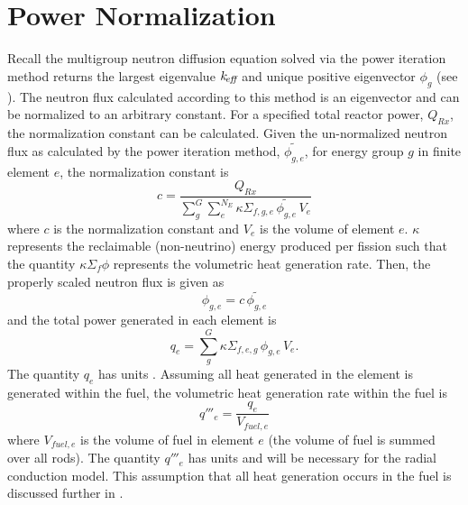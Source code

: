 \section{Power Normalization}
  Recall the multigroup neutron diffusion equation solved via the power
  iteration method returns the largest eigenvalue $k_{\!\mbox{\scriptsize \em eff}}$ and unique positive
  eigenvector $\phi_g$ (see ). The neutron flux
  calculated according to this method is an eigenvector and can be normalized
  to an arbitrary constant. For a specified total reactor power, $Q_{Rx}$, the
  normalization constant can be calculated. Given the un-normalized neutron flux 
  as calculated by the power iteration method, $\widetilde{\phi_{g,e}}$, for  
  energy group $g$ in finite element $e$, the normalization constant is 
  \begin{equation}
    \label{eq:normalization_c}
    c = \frac{Q_{Rx}}{\sum_{g}^{G} \sum_{e}^{N_E} \kappa \Sigma_{f,g,e} \,
      \widetilde{\phi_{g,e}} \, V_e}
  \end{equation}
  where $c$ is the normalization constant and $V_e$ is the volume of element
  $e$. $\kappa$ represents the reclaimable (non-neutrino) energy produced per
  fission such that the quantity $\kappa \Sigma_f \phi$ represents the
  volumetric heat generation rate. 
  Then, the properly scaled neutron flux is given as
  \begin{equation}
    \label{eq:normalization_phi}
    \phi_{g,e} = c \, \widetilde{\phi_{g,e}}
  \end{equation}
  and the total power generated in each element is 
  \begin{equation}
    \label{eq:elementpwr}
    q_{e} = \sum_g^G \kappa \Sigma_{f,e,g} \, \phi_{g,e} \, V_e .
  \end{equation}
  The quantity $q_e$ has units . Assuming all heat generated in the
  element is generated within the fuel, the volumetric heat generation rate 
  within the fuel is 
  \begin{equation}
    \label{eq:elementqppp_fuel}
    q'''_{e} = \frac{q_e}{V_{fuel,e}}
  \end{equation}
  where $V_{fuel,e}$ is the volume of fuel in element $e$ (the volume of fuel is
  summed over all rods). The quantity $q'''_e$ has units
   and will be necessary for the radial
  conduction model. This assumption that all heat generation occurs in the fuel
  is discussed further in .

